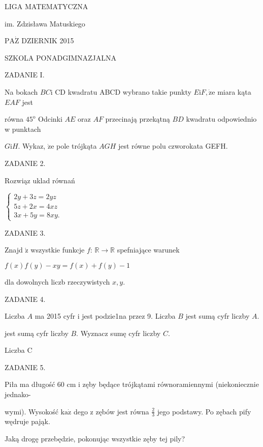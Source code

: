 \documentclass[a4paper,12pt]{article}
\begin{document}
LIGA MATEMATYCZNA

im. Zdzisława Matuskiego

$\mathrm{P}\mathrm{A}\dot{\mathrm{Z}}$ DZIERNIK 2015

SZKOLA PONADGIMNAZJALNA

ZADANIE I.

Na bokach $BC\mathrm{i}$ CD kwadratu ABCD wybrano takie punkty $E\mathrm{i}F, \dot{\mathrm{z}}\mathrm{e}$ miara kąta $EAF$ jest

równa $45^{\mathrm{o}}$ Odcinki $AE$ oraz $AF$ przecinają przekątną $BD$ kwadratu odpowiednio w punktach

$G\mathrm{i}H$. Wykaz, $\dot{\mathrm{z}}\mathrm{e}$ pole trójkąta $AGH$ jest równe polu czworokata GEFH.

ZADANIE 2.

Rozwiąz uklad równań

$\left\{\begin{array}{l}
2y+3z=2yz\\
5z+2x=4xz\\
3x+5y=8xy.
\end{array}\right.$

ZADANIE 3.

Znajd $\acute{\mathrm{z}}$ wszystkie funkcje $f$: $\mathbb{R}\rightarrow \mathbb{R}$ spefniające warunek

$f(x)f(y)-xy=f(x)+f(y)-1$

dla dowolnych liczb rzeczywistych $x, y.$

ZADANIE 4.

Liczba $A$ ma 2015 cyfr i jest podzie1na przez 9. Liczba $B$ jest sumą cyfr liczby $A.$

jest sumą cyfr liczby $B$. Wyznacz sumę cyfr liczby $C.$

Liczba C

ZADANIE 5.

Piła ma długość 60 cm i zęby będące trójkątami równoramiennymi (niekoniecznie jednako-

wymi). Wysokość $\mathrm{k}\mathrm{a}\dot{\mathrm{z}}$ dego z zębów jest równa $\displaystyle \frac{2}{3}$ jego podstawy. Po zębach pify wędruje pająk.

Jaką drogę przebędzie, pokonując wszystkie zęby tej pily?
\end{document}
